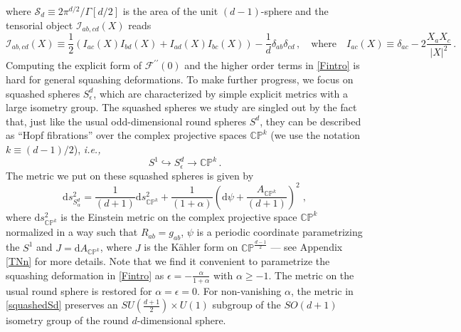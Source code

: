 \documentclass[12pt]{article}
\numberwithin{equation}{section}
\newcommand{\ie}{{\it i.e.,}\ }
\begin{document}
%
where $\mathcal{S}_{d}\equiv2\pi^{d/2}/\Gamma[d/2]$ is the area of the unit $(d-1)$-sphere and the tensorial object $\mathcal{I}_{ab,cd}(X)$ reads
%
\begin{equation}\label{Iabcddef}
\mathcal{I}_{ab,cd}(X)\equiv\frac{1}{2}\left(I_{ac}(X)I_{bd}(X)+I_{ad}(X)I_{bc}(X)\right)-\frac{1}{d}\delta_{ab}\delta_{cd}\, , \quad \text{where} \quad I_{ac}(X)\equiv\delta_{ac}-2\frac{X_aX_c}{|X|^2}\, .
\end{equation}
%
Computing the explicit form of $\mathcal{F}^{\prime\prime}(0)$ and the higher order terms in \eqref{Fintro} is hard for general squashing deformations. To make further progress, we focus on squashed spheres $S^{d}_{\epsilon}$, which are characterized by simple explicit metrics with a large isometry group. The squashed spheres we study are singled out by the fact that, just like the usual odd-dimensional round spheres $S^d$, they can be described as ``Hopf fibrations'' over the complex projective spaces $\mathbb{CP}^{k}$ (we use the notation $k\equiv (d-1)/2$), \ie
%
\begin{equation}\label{fib}
S^1\hookrightarrow S_{\epsilon}^d\rightarrow \mathbb{CP}^{k}\,.
\end{equation}
%
The metric we put on these squashed spheres is given by 
%
\begin{equation}\label{squashedSd}
\mathrm{d}s_{S^{d}_{\alpha}}^2 =\frac{1}{(d+1)} \mathrm{d}s^2_{\mathbb{CP}^{k}}+\frac{1}{(1+\alpha)}\left(\mathrm{d}\psi+\frac{A_{\mathbb{CP}^{k}}}{(d+1)}\right)^2\;,
\end{equation}
%
where $\mathrm{d}s^2_{\mathbb{CP}^{k}}$ is the Einstein metric on the complex projective space $\mathbb{CP}^{k}$ normalized in a way such that $R_{ab}=g_{ab}$, $\psi$ is a periodic coordinate parametrizing the $S^1$ and $J=\mathrm{d}A_{\mathbb{CP}^{k}}$, where $J$ is the K\"ahler form on $\mathbb{CP}^{\frac{d-1}{2}}$ --- see Appendix \ref{TNn} for more details. Note that we find it convenient to parametrize the squashing deformation in \eqref{Fintro} as $\epsilon = -\frac{\alpha}{1+\alpha}$ with $\alpha\geq -1$. The metric on the usual round sphere is restored for $\alpha=\epsilon=0$. For non-vanishing $\alpha$, the metric in \eqref{squashedSd} preserves an $SU(\frac{d+1}{2})\times U(1)$ subgroup of the $SO(d+1)$ isometry group of the round $d$-dimensional sphere.
\end{document}
